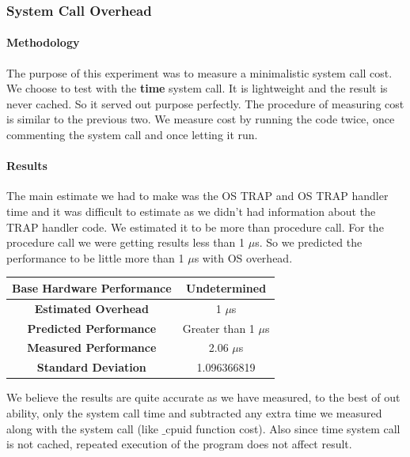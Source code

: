 \documentclass[conference]{IEEEtran}
\begin{document}

\subsubsection{System Call Overhead}

\paragraph{Methodology}

The purpose of this experiment was to measure a minimalistic system call cost. We choose to test with the \textbf{time} system call. It is lightweight and the result is never cached. So it served out purpose perfectly.
The procedure of measuring cost is similar to the previous two. We measure cost by running the code twice, once commenting the system call and once letting it run.

\paragraph{Results}

The main estimate we had to make was the OS TRAP and OS TRAP handler time and it was difficult to estimate as we didn't had information about the TRAP handler code. We estimated it to be more than procedure call. For the procedure call we were getting results less than 1 $\mu$s. So we predicted the performance to be little more than 1 $\mu$s with OS overhead.

\begin{center}
\begin{tabular}{ |c|c| } 
  \hline
  \textbf{Base Hardware Performance} & Undetermined \\ 
  \hline
  \textbf{Estimated Overhead} &  1 $\mu$s \\ 
  \hline
  \textbf{Predicted Performance} & Greater than 1 $\mu$s \\ 
  \hline
  \textbf{Measured Performance} & 2.06 $\mu$s \\ 
  \hline
  \textbf{Standard Deviation} & 1.096366819  \\ 
  \hline
\end{tabular}
\end{center}

We believe the results are quite accurate as we have measured, to the best of out ability, only the system call time and subtracted any extra time we measured along with the system call (like $\_$cpuid function cost). Also since time system call is not cached, repeated execution of the program does not affect result.
\end{document}
